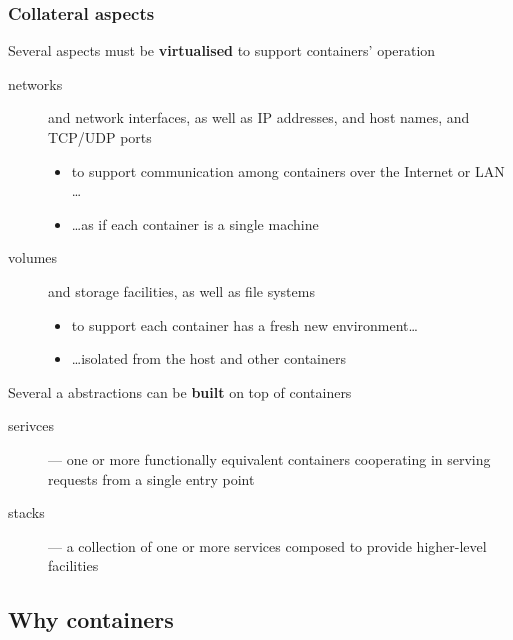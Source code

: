 \documentclass[presentation]{beamer}\mode<presentation>{\usetheme{AMSBolognaFC}}
\begin{document}
\begin{frame}[allowframebreaks]
    \frametitle{Collateral aspects}

    \begin{block}{Several aspects must be \textbf{virtualised} to support containers' operation}
        \begin{description}
            \item[networks] and \alert{network interfaces}, as well as IP addresses, and host names, and TCP/UDP ports
            \begin{itemize}\small
                \item to support communication among containers over the Internet or LAN \dots
                \item \ldots as if each container is a single machine
            \end{itemize}

            \item[volumes] and \alert{storage facilities}, as well as file systems
            \begin{itemize}\small
                \item to support each container has a fresh new environment\ldots
                \item \ldots isolated from the host and other containers
            \end{itemize}
        \end{description}
    \end{block}

    \begin{block}{Several a abstractions can be \textbf{built} on top of containers}
        \begin{description}
            \item[serivces] --- one or more functionally equivalent containers cooperating in serving requests from a single entry point

            \item[stacks] --- a collection of one or more services composed to provide higher-level facilities
        \end{description}
    \end{block}

\end{frame}

\subsection{Why containers}
\end{document}
